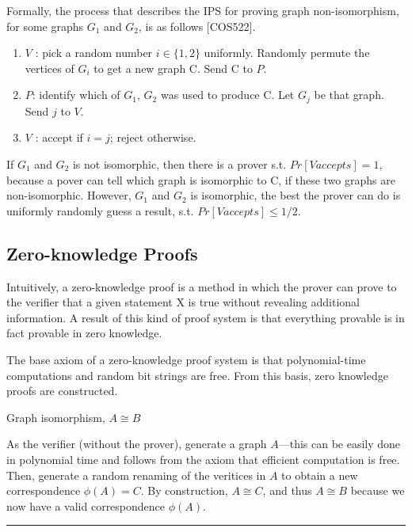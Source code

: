 \documentclass[twoside]{article}
\renewcommand{\cite}[1]{[#1]}
\newenvironment{example}{{\bf Example:}}{\hfill\rule{2mm}{2mm}}
\begin{document}
Formally, the process that describes the IPS for proving graph non-isomorphism, for some graphs $G_1$ and $G_2$, is as follows \cite{COS522}.
\begin{enumerate}
\item $V$ : pick a random number $i \in \{1, 2\}$ uniformly. Randomly permute the vertices of $G_i$ to get a new graph C. Send C to $P$.
\item $P$: identify which of $G_1$, $G_2$ was used to produce C. Let $G_j$ be that graph. Send $j$ to $V$.
\item $V$ : accept if $i=j$; reject otherwise.
\end{enumerate}

If $G_1$ and $G_2$ is not isomorphic, then there is a prover s.t. $Pr[V accepts] = 1$, because a pover can tell
which graph is isomorphic to C, if these two graphs are non-isomorphic. However, $G_1$ and $G_2$ is isomorphic, the best the prover can do is uniformly randomly guess a result, s.t. $Pr[V accepts] \leq 1/2$.

\subsection{Zero-knowledge Proofs}

Intuitively, a zero-knowledge proof is a method in which the prover can prove to the verifier that a given statement X is true without revealing additional information.
A result of this kind of proof system is that everything provable is in fact provable in zero knowledge. 

The base axiom of a zero-knowledge proof system is that polynomial-time computations and random bit strings are free. 
From this basis, zero knowledge proofs are constructed. 

\begin{example}
Graph isomorphism, $A \cong B$

As the verifier (without the prover), generate a graph $A$---this can be easily done in polynomial time and follows from the axiom that efficient computation is free. 
Then, generate a random renaming of the veritices in $A$ to obtain a new correspondence $\phi(A) = C$. 
By construction, $A \cong C$, and thus $A \cong B$ because we now have a valid correspondence $\phi(A)$. 

\end{example}
\end{document}
